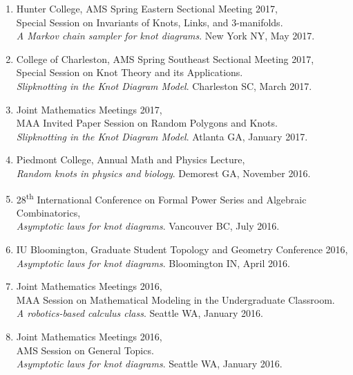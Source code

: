 \documentclass[letterpaper]{article}
\begin{document}
\begin{enumerate}
\item Hunter College, AMS Spring Eastern Sectional Meeting 2017, \\
  Special Session on Invariants of Knots, Links, and 3-manifolds. \\
  \textit{A Markov chain sampler for knot diagrams}. New York NY, May 2017.

\item College of Charleston, AMS Spring Southeast Sectional Meeting 2017, \\
  Special Session on Knot Theory and its Applications. \\
  \textit{Slipknotting in the Knot Diagram Model}. Charleston SC, March 2017.

\item Joint Mathematics Meetings 2017, \\
  MAA Invited Paper Session on Random Polygons and Knots. \\
  \textit{Slipknotting in the Knot Diagram Model}. Atlanta GA, January 2017.

\item Piedmont College, Annual Math and Physics Lecture, \\
  \textit{Random knots in physics and biology}. Demorest GA, November 2016.

\item 28\textsuperscript{th} International Conference on Formal Power Series and
  Algebraic Combinatorics, \\
  \textit{Asymptotic laws for knot diagrams}. Vancouver BC, July 2016.

\item IU Bloomington, Graduate Student Topology and Geometry Conference 2016, \\
  \textit{Asymptotic laws for knot diagrams}. Bloomington IN, April 2016.
  
\item Joint Mathematics Meetings 2016, \\
  MAA Session on Mathematical Modeling in the Undergraduate Classroom. \\
  \textit{A robotics-based calculus class}. Seattle WA, January 2016.

\item Joint Mathematics Meetings 2016, \\
  AMS Session on General Topics. \\
  \textit{Asymptotic laws for knot diagrams}. Seattle WA, January 2016.


\end{enumerate}
\end{document}
